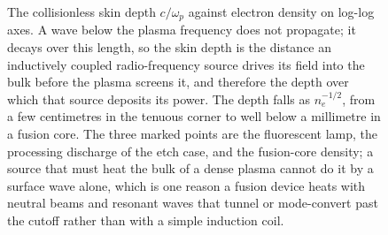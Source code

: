 \begin{figure}[htbp]
\centering
{}
\caption[Collisionless skin depth versus density]{The collisionless skin
depth $c/\omega_p$ against electron density on log-log axes. A wave below the
plasma frequency does not propagate; it decays over this length, so the skin
depth is the distance an inductively coupled radio-frequency source drives its
field into the bulk before the plasma screens it, and therefore the depth over
which that source deposits its power. The depth falls as $n_e^{-1/2}$, from a
few centimetres in the tenuous corner to well below a millimetre in a fusion
core. The three marked points are the fluorescent lamp, the processing
discharge of the etch case, and the fusion-core density; a source that must
heat the bulk of a dense plasma cannot do it by a surface wave alone, which is
one reason a fusion device heats with neutral beams and resonant waves that
tunnel or mode-convert past the cutoff rather than with a simple induction
coil.}
\label{fig:vol04ch13:skin-depth}
\end{figure}
